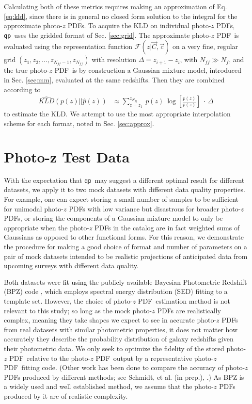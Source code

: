 \documentclass[\docopts]{\docclass}
\newcommand{\qp}{\texttt{qp}}
\newcommand{\pz}{photo-$z$ PDF}
\begin{document}
Calculating both of these metrics requires making an approximation of Eq. 
\ref{eq:kld}, since there is in general no closed form solution to the integral 
for the approximate \pz s.  To acquire the KLD on individual \pz s, \qp\ uses 
the gridded format of Sec. \ref{sec:grid}.  The approximate \pz\ is evaluated 
using the representation function $\mathcal{F}(z | \vec{C}, \vec{c})$ on a very 
fine, regular grid $(z_{1}, z_{2}, \dots, z_{N_{ff}-1}, z_{N_{ff}})$ with 
resolution $\Delta=z_{i+1}-z_{i}$, with $N_{ff}\gg N_{f}$, and the true \pz\ is 
by construction a Gaussian mixture model, introduced in Sec. \ref{sec:mm}, 
evaluated at the same redshifts.  Then they are combined according to
\begin{align}
  \label{eq:kld}
  \hat{KLD}(p(z) || \hat{p}(z)) &\approx \sum_{z=z_{1}}^{z_{N_{ff}}}\ p(z)\ 
\log\left[\frac{p(z)}{\hat{p}(z)}\right]\ \cdot\ \Delta
\end{align}
to estimate the KLD.  We attempt to use the most appropriate interpolation 
scheme for each format, noted in Sec. \ref{sec:approx}.






\section{Photo-z Test Data}
\label{sec:data}

With the expectation that \qp\  may suggest a different optimal result for 
different datasets, we apply it to two mock datasets with different data 
quality properties.  For example, one can expect storing a small number of 
samples to be sufficient for unimodal \pz s with low variance but disastrous 
for broader \pz s, or storing the components of a Gaussian mixture model to 
only be appropriate when the \pz s in the catalog are in fact weighted sums of 
Gaussians as opposed to other functional forms.  For this reason, we 
demonstrate the procedure for making a good choice of format and number of 
parameters on a pair of mock datasets intended to be realistic projections of 
anticipated data from upcoming surveys with different data quality.

Both datasets were fit using the publicly available Bayesian Photometric 
Redshift (BPZ) code \citep{benitez_bayesian_2000}, which employs spectral 
energy distribution (SED) fitting to a template set.  However, the choice of 
\pz\ estimation method is not relevant to this study; so long as the mock \pz s 
are realistically complex, meaning they take shapes we expect to see in 
accurate \pz s from real datasets with similar photometric properties, it does 
not matter how accurately they describe the probability distribution of galaxy 
redshifts given their photometric data.  We only seek to optimize the fidelity 
of the stored \pz\ relative to the \pz\ output by a representative \pz\ fitting 
code.  (Other work has been done to compare the accuracy of \pz s produced by 
different methods; see Schmidt, et al. (in prep.), 
\citet{tanaka_photometric_2017}.)  As BPZ is a widely used and well established 
method, we assume that the \pz s produced by it are of realistic complexity.
\end{document}
